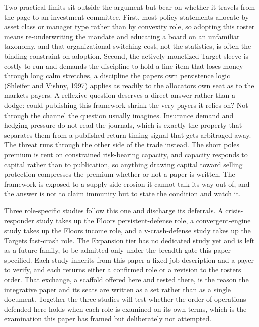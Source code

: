 \documentclass[12pt, a4paper]{article}
\begin{document}
Two practical limits sit outside the argument but bear on whether it
travels from the page to an investment committee. First, most policy
statements allocate by asset class or manager type rather than by
convexity role, so adopting this roster means re-underwriting the
mandate and educating a board on an unfamiliar taxonomy, and that
organizational switching cost, not the statistics, is often the binding
constraint on adoption. Second, the actively monetized Target sleeve is
costly to run and demands the discipline to hold a line item that loses
money through long calm stretches, a discipline the
paper\textquotesingle s own persistence logic (Shleifer and Vishny,
1997) applies as readily to the allocator\textquotesingle s own seat as
to the market\textquotesingle s payers. A reflexive question deserves a
direct answer rather than a dodge: could publishing this framework
shrink the very payers it relies on? Not through the channel the
question usually imagines. Insurance demand and hedging pressure do not
read the journals, which is exactly the property that separates them
from a published return-timing signal that gets arbitraged away. The
threat runs through the other side of the trade instead. The short
pole\textquotesingle s premium is rent on constrained risk-bearing
capacity, and capacity responds to capital rather than to publication,
so anything drawing capital toward selling protection compresses the
premium whether or not a paper is written. The framework is exposed to a
supply-side erosion it cannot talk its way out of, and the answer is not
to claim immunity but to state the condition and watch it.

Three role-specific studies follow this one and discharge its deferrals.
A crisis-responder study takes up the Floor\textquotesingle s
persistent-defense role, a convergent-engine study takes up the
Floor\textquotesingle s income role, and a v-crash-defense study takes
up the Target\textquotesingle s fast-crash role. The Expansion tier has
no dedicated study yet and is left as a future family, to be admitted
only under the breadth gate this paper specified. Each study inherits
from this paper a fixed job description and a payer to verify, and each
returns either a confirmed role or a revision to the
roster\textquotesingle s order. That exchange, a scaffold offered here
and tested there, is the reason the integrative paper and its seats are
written as a set rather than as a single document. Together the three
studies will test whether the order of operations defended here holds
when each role is examined on its own terms, which is the examination
this paper has framed but deliberately not attempted.
\end{document}
